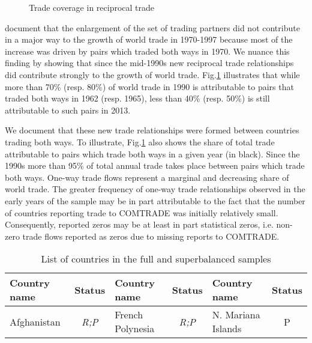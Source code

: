 \documentclass[12pt,twoside,a4paper,notitlepage]{article}
\begin{document}
{%
\begin{figure}[h!]
\begin{center}
\setlength{\fboxrule}{1pt} %
\setlength{\fboxsep}{.1in} %
\end{center}
\caption{Trade coverage in reciprocal trade \label{fig:reciprocal}}
\end{figure}

\cite{Helpman2008} document that the enlargement of the set of trading partners did not contribute in a major way to the growth of world trade in 1970-1997 because most of the increase was driven by pairs which traded both ways in 1970. We nuance this finding by showing that since the mid-1990s new reciprocal trade relationships did contribute strongly to the growth of world trade. Fig.\ref{fig:reciprocal} illustrates that while more than 70\% (resp. 80\%) of world trade in 1990 is attributable to pairs that traded both ways in 1962 (resp. 1965), less than 40\% (resp. 50\%) is still attributable to such pairs in 2013.   

We document that these new trade relationships were formed between countries trading both ways. To illustrate, Fig.\ref{fig:reciprocal} also shows the share of total trade attributable to pairs which trade both ways in a given year (in black). Since the 1990s more than 95\% of total annual trade takes place between pairs which trade both ways. One-way trade flows represent a marginal and decreasing share of world trade. The greater frequency of one-way trade relationships observed in the early years of the sample may be in part attributable to the fact that the number of countries reporting trade to COMTRADE was initially relatively small. Consequently, reported zeros may be at least in part statistical zeros, i.e. non-zero trade flows reported as zeros due to missing reports to COMTRADE. 

\begin{table}
\caption {List of countries in the full and superbalanced samples \label{tab:list1}} 
\begin{tabular}{|l|c|l|c|l|c|}
\hline
{\bf Country name} & {\bf Status} & {\bf Country name} & {\bf Status} & {\bf Country name} & {\bf Status } \\
\hline
Afghanistan &  {\it R;P} & French Polynesia &  {\it R;P} & N. Mariana Islands &          P \\


\end{tabular}
\end{table}}
\end{document}
